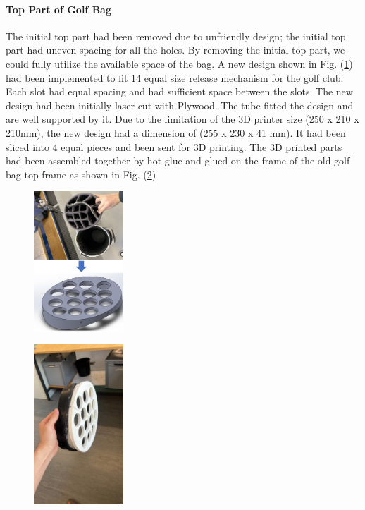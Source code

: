 \documentclass[11pt,landscape]{article}
\begin{document}
\begin{multicols}{3}
\paragraph{Top Part of Golf Bag}
The initial top part had been removed due to unfriendly design; the initial top
part had uneven spacing for all the holes. By removing the initial top part, we
could fully utilize the available space of the bag. A new design shown in Fig.
(\ref{fig:top_part}) had been implemented to fit 14 equal size release mechanism
for the golf club. Each slot had equal spacing and had sufficient space between
the slots. The new design had been initially laser cut with Plywood. The tube
fitted the design and are well supported by it. Due to the limitation of the 3D
printer size (250 x 210 x 210mm), the new design had a dimension of (255 x 230
x 41 mm). It had been sliced into 4 equal pieces and been sent for 3D printing.
The 3D printed parts had been assembled together by hot glue and glued on the
frame of the old golf bag top frame as shown in Fig. (\ref{fig:3d_top})

\begin{figure}[H]
    \begin{center}
        \includegraphics[width=0.3\textwidth]{Toppart.png}
        \label{fig:top_part}
    \end{center}
\end{figure}

\begin{figure}[H]
    \begin{center}
        \includegraphics[width=0.3\textwidth]{3Dparts.png}
        \label{fig:3d_top}
    \end{center}
\end{figure}


\end{multicols}
\end{document}

